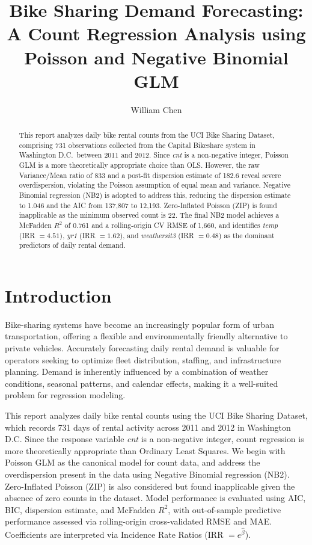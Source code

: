 \documentclass[12pt, a4paper]{article}
\title{
    \vspace{-1cm}
    \Large\textbf{Bike Sharing Demand Forecasting:\\[0.3em]
    A Count Regression Analysis using Poisson and Negative Binomial GLM}
}
\author{
    William Chen
}
\date{}
\begin{document}
\maketitle
\thispagestyle{empty}

\begin{abstract}
This report analyzes daily bike rental counts from the UCI Bike Sharing
Dataset, comprising 731 observations collected from the Capital Bikeshare
system in Washington D.C.\ between 2011 and 2012. Since \textit{cnt} is
a non-negative integer, Poisson GLM is a more theoretically appropriate
choice than OLS. However, the raw Variance/Mean ratio of 833 and a
post-fit dispersion estimate of 182.6 reveal severe overdispersion,
violating the Poisson assumption of equal mean and variance. Negative
Binomial regression (NB2) is adopted to address this, reducing the
dispersion estimate to 1.046 and the AIC from 137,807 to 12,193.
Zero-Inflated Poisson (ZIP) is found inapplicable as the minimum observed
count is 22. The final NB2 model achieves a McFadden $R^2$ of 0.761 and
a rolling-origin CV RMSE of 1{,}660, and identifies \textit{temp}
(IRR $= 4.51$), \textit{yr1} (IRR $= 1.62$), and \textit{weathersit3}
(IRR $= 0.48$) as the dominant predictors of daily rental demand.
\end{abstract}


\newpage
\section{Introduction}
Bike-sharing systems have become an increasingly popular form of urban
transportation, offering a flexible and environmentally friendly
alternative to private vehicles. Accurately forecasting daily rental
demand is valuable for operators seeking to optimize fleet distribution,
staffing, and infrastructure planning. Demand is inherently influenced
by a combination of weather conditions, seasonal patterns, and calendar
effects, making it a well-suited problem for regression modeling.

This report analyzes daily bike rental counts using the UCI Bike Sharing
Dataset, which records 731 days of rental activity across 2011 and 2012
in Washington D.C. Since the response variable \textit{cnt} is a
non-negative integer, count regression is more theoretically appropriate
than Ordinary Least Squares. We begin with Poisson GLM as the canonical
model for count data, and address the overdispersion present in the data
using Negative Binomial regression (NB2). Zero-Inflated Poisson (ZIP) is
also considered but found inapplicable given the absence of zero counts
in the dataset. Model performance is evaluated using AIC, BIC, dispersion
estimate, and McFadden $R^2$, with out-of-sample predictive performance
assessed via rolling-origin cross-validated RMSE and MAE. Coefficients
are interpreted via Incidence Rate Ratios (IRR $= e^{\hat{\beta}}$).
\end{document}

